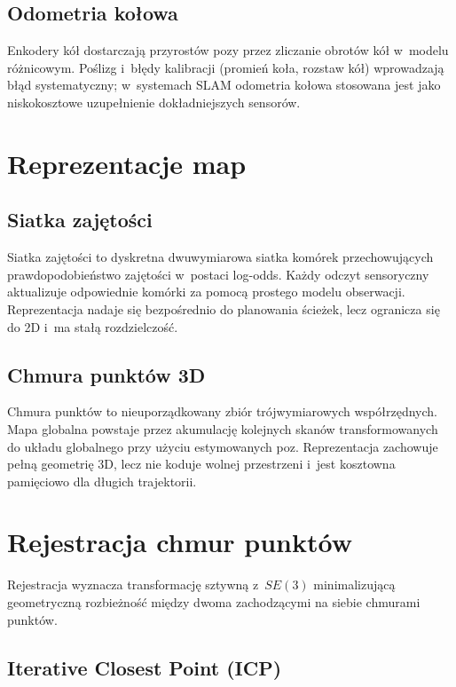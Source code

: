 \subsection{Odometria kołowa}

Enkodery kół dostarczają przyrostów pozy przez zliczanie obrotów kół
w~modelu różnicowym.
Poślizg i~błędy kalibracji (promień koła, rozstaw kół) wprowadzają błąd
systematyczny; w~systemach SLAM odometria kołowa stosowana jest jako
niskokosztowe uzupełnienie dokładniejszych sensorów.

\section{Reprezentacje map}

\subsection{Siatka zajętości}

Siatka zajętości to dyskretna dwuwymiarowa siatka komórek przechowujących
prawdopodobieństwo zajętości w~postaci log-odds.
Każdy odczyt sensoryczny aktualizuje odpowiednie komórki za pomocą prostego
modelu obserwacji.
Reprezentacja nadaje się bezpośrednio do planowania ścieżek,
lecz ogranicza się do 2D i~ma stałą rozdzielczość.

\subsection{Chmura punktów 3D}

Chmura punktów to nieuporządkowany zbiór trójwymiarowych współrzędnych.
Mapa globalna powstaje przez akumulację kolejnych skanów transformowanych
do układu globalnego przy użyciu estymowanych poz.
Reprezentacja zachowuje pełną geometrię 3D, lecz nie koduje wolnej przestrzeni
i~jest kosztowna pamięciowo dla długich trajektorii.

\section{Rejestracja chmur punktów}

Rejestracja wyznacza transformację sztywną z~$SE(3)$ minimalizującą
geometryczną rozbieżność między dwoma zachodzącymi na siebie chmurami punktów.

\subsection{Iterative Closest Point (ICP)}

